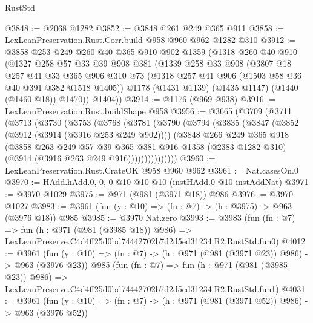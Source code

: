 \begin{lexlean}{RustStd}
\begin{coremodule}
@3848 := @2068 @1282
@3852 := @3848 @261 @249 @365 @911
@3858 := LexLeanPreservation.Rust.Corr.build @958 @960 @962 @1282 @310
@3912 := @3858
    @253
    @249
    @260
    @40
    @365
    @910
    @902
    @1359
    (@1318
      @260
      @40
      @910
      (@1327
        @258
        @57
        @33
        @39
        @908
        @381
        (@1339
          @258
          @33
          @908
          (@3807
            @18
            @257
            @41
            @33
            @365
            @906
            @310
            @73
            (@1318 @257 @41 @906 (@1503 @58 @36 @40 @391 @382 @1518 @1405))
            @1178
            (@1431 @1139)
            (@1435 @1147)
            (@1440 (@1460 @18))
            @1470))
        @1404))
@3914 := @1176 (@969 @938)
@3916 := LexLeanPreservation.Rust.buildShape @958
@3956 := @3665
    (@3709
      (@3711
        (@3713
          (@3730
            (@3753
              (@3768
                (@3781
                  (@3790
                    (@3794
                      (@3835
                        (@3847
                          (@3852 (@3912 (@3914 (@3916 @253 @249 @902))))
                          (@3848
                            @266
                            @249
                            @365
                            @918
                            (@3858
                              @263
                              @249
                              @57
                              @39
                              @365
                              @381
                              @916
                              @1358
                              (@2383 @1282 @310)
                              (@3914 (@3916 @263 @249 @916)))))))))))))))
@3960 := LexLeanPreservation.Rust.CrateOK @958 @960 @962
@3961 := Nat.casesOn.{0}
@3970 := HAdd.hAdd.{0, 0, 0} @10 @10 @10 (instHAdd.{0} @10 instAddNat)
@3971 := @3970 @1029
@3975 := @971 (@981 (@3971 @18)) @986
@3976 := @3970 @1027
@3983 := @3961 (fun (y : @10) => (fn : @7) -> (h : @3975) -> @963 (@3976 @18)) @985
@3985 := @3970 Nat.zero
@3993 := @3983
    (fun (fn : @7) =>
    fun (h : @971 (@981 (@3985 @18)) @986) =>
    LexLeanPreserve.C4d4ff25d0bd74442702b7d2d5ed31234.R2.RustStd.fun0)
@4012 := @3961
    (fun (y : @10) => (fn : @7) -> (h : @971 (@981 (@3971 @23)) @986) -> @963 (@3976 @23))
    @985
    (fun (fn : @7) =>
    fun (h : @971 (@981 (@3985 @23)) @986) =>
    LexLeanPreserve.C4d4ff25d0bd74442702b7d2d5ed31234.R2.RustStd.fun1)
@4031 := @3961
    (fun (y : @10) => (fn : @7) -> (h : @971 (@981 (@3971 @52)) @986) -> @963 (@3976 @52))

\end{coremodule}
\end{lexlean}
